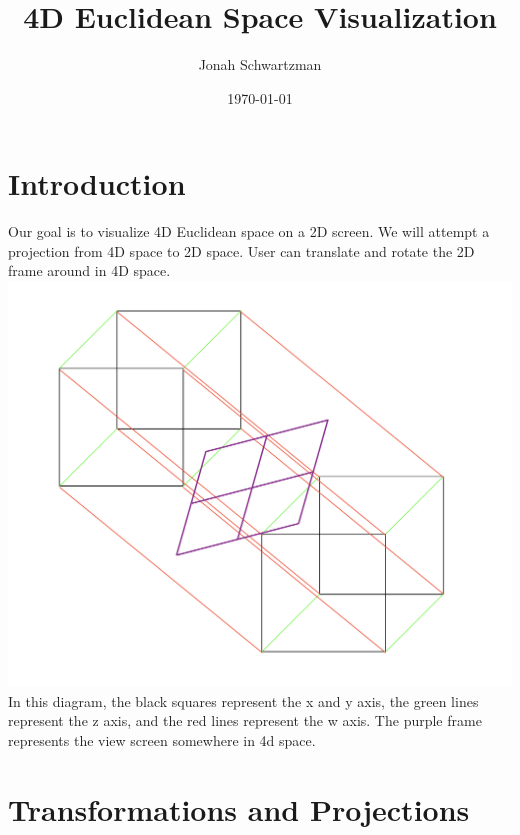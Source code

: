 \documentclass{article}
\begin{document}
\title{4D Euclidean Space Visualization}
\author{Jonah Schwartzman}
\date{\today}

\maketitle

\section{Introduction}
Our goal is to visualize 4D Euclidean space on a 2D screen.
\newline\newline We will attempt a projection from 4D space to 2D space.
\newline\newline User can translate and rotate the 2D frame around in 4D space.
\newline\includegraphics[scale=0.5]{4dProjection.png}
\newline In this diagram, the black squares represent the x and y axis, the green lines represent the z axis, and the red lines represent the w axis.
\newline The purple frame represents the view screen somewhere in 4d space.

\section{Transformations and Projections}
\end{document}
